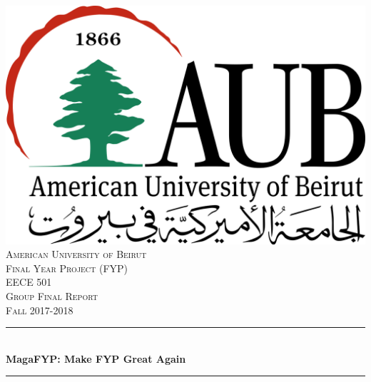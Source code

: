 \documentclass[12pt]{article}
\begin{document}
\begin{titlepage}

\newcommand{\HRule}{\rule{\linewidth}{0.5mm}}

\center
 
\includegraphics[scale=0.17]{logo.png}\\[1cm] 
 
\textsc{\LARGE American University of Beirut}\\[0.5cm]
\textsc{\Large Final Year Project (FYP)}\\[0.5cm] 
\textsc{\large EECE 501}\\[0.5cm] 
\textsc{\large Group Final Report}\\[0.5cm] 
\textsc{\large Fall 2017-2018}\\[0.5cm] 


\HRule \\[0.4cm]
{ \Large \bfseries MagaFYP: Make FYP Great Again}\\[0.4cm] 
\HRule \\[0.5cm]
 


\end{titlepage}
\end{document}

